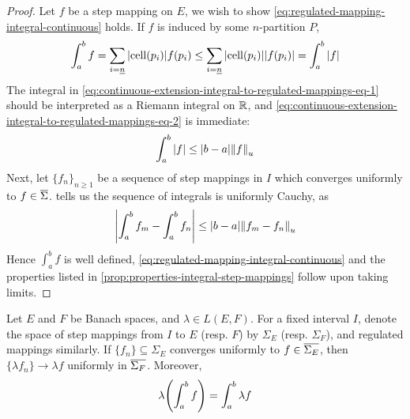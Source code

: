 \documentclass[../main-manifolds.tex]{subfiles}
\begin{document}
\begin{proof}
    Let $f$ be a step mapping on $E$, we wish to show \cref{eq:regulated-mapping-integral-continuous} holds. If $f$ is induced by some $n$-partition $P$, 
    \begin{equation}\label{eq:continuous-extension-integral-to-regulated-mappings-eq-1}
    \int_a^b f = \sum_{i=\underline{n}}\abs{\operatorname{cell}(p_i)} f(p_i)\leq \sum_{i=\underline{n}}\abs{\operatorname{cell}(p_i)}\abs{f(p_i)} = \int_a^b\vert f\vert 
    \end{equation}
    The integral in \cref{eq:continuous-extension-integral-to-regulated-mappings-eq-1} should be interpreted as a Riemann integral on $\mathbb{R}$, and \cref{eq:continuous-extension-integral-to-regulated-mappings-eq-2} is immediate:
    \begin{equation}\label{eq:continuous-extension-integral-to-regulated-mappings-eq-2}
        \int_a^b\vert f\vert \leq \abs{b-a}\norm{f}_u
    \end{equation}
    Next, let $\{f_n\}_{n\geq 1}$ be a sequence of step mappings in $I$ which converges uniformly to $f\in \overline{\Sigma}$.  tells us the sequence of integrals is uniformly Cauchy, as
    \begin{equation}\label{eq:continuous-extension-integral-to-regulated-mappings-eq-3}
        \abs{\int_a^bf_m - \int_a^b f_n}\leq \abs{b-a}\norm{f_m - f_n}_u
    \end{equation}
    Hence $\int_a^b f$ is well defined, \cref{eq:regulated-mapping-integral-continuous} and the properties listed in \cref{prop:properties-integral-step-mappings} follow upon taking limits.
\end{proof}
\begin{wts}\label{prop:regulated-mappings-integration-clms}
    Let $E$ and $F$ be Banach spaces, and $\lambda\in L(E,F)$. For a fixed interval $I$, denote the space of step mappings from $I$ to $E$ (resp. $F$) by $\Sigma_E$ (resp. $\Sigma_F$), and regulated mappings similarly. If $\{f_n\}\subseteq \Sigma_E$ converges uniformly to $f\in \overline{\Sigma_E}$, then $\{\lambda f_n\}\to \lambda f$ uniformly in $\overline{\Sigma_F}$. Moreover,
    \begin{equation}\label{eq:regulated-mappings-integration-clms}
    \lambda\qty(\int_a^b f) = \int_a^b\lambda f
    \end{equation}
\end{wts}
\end{document}
